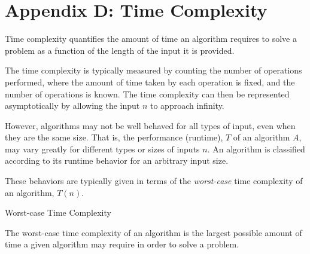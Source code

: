 \section{Appendix D: Time Complexity}

	Time complexity quantifies the amount of time an algorithm requires to solve a problem as a function of the length of the input it is provided. 
    
    The time complexity is typically measured by counting the number of operations performed, where the amount of time taken by each operation is fixed, and the number of operations is known. 
    The time complexity can then be represented asymptotically by allowing the input $n$ to approach infinity.

However, algorithms may not be well behaved for all types of input, even when they are the same size. That is, the performance (runtime), $T$ of an algorithm $A$, may vary greatly for different types or sizes of inputs $n$. An algorithm is  classified according to its runtime behavior for an arbitrary input size. 

These behaviors are typically given in terms of the \emph{worst-case} time complexity of an algorithm, $T(n)$. 

\begin{defn}{Worst-case Time Complexity}
	
    The worst-case time complexity of an algorithm is the largest possible amount of time a given algorithm may require in order to solve a problem. 
\end{defn}


